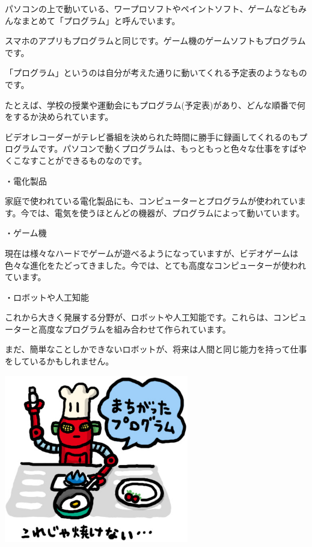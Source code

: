 \documentclass[a4paper,12pt]{jarticle}
\begin{document}
パソコンの上で動いている、ワープロソフトやペイントソフト、ゲームなどもみんなまとめて「プログラム」と呼んでいます。


\bigskip

スマホのアプリもプログラムと同じです。ゲーム機のゲームソフトもプログラムです。

「プログラム」というのは自分が考えた通りに動いてくれる予定表のようなものです。

たとえば、学校の授業や運動会にもプログラム(予定表)があり、どんな順番で何をするか決められています。

ビデオレコーダーがテレビ番組を決められた時間に勝手に録画してくれるのもプログラムです。パソコンで動くプログラムは、もっともっと色々な仕事をすばやくこなすことができるものなのです。

\bigskip

・電化製品


\bigskip

家庭で使われている電化製品にも、コンピューターとプログラムが使われています。今では、電気を使うほとんどの機器が、プログラムによって動いています。


\bigskip

・ゲーム機


\bigskip

現在は様々なハードでゲームが遊べるようになっていますが、ビデオゲームは色々な進化をたどってきました。今では、とても高度なコンピューターが使われています。


\bigskip

・ロボットや人工知能


\bigskip

これから大きく発展する分野が、ロボットや人工知能です。これらは、コンピューターと高度なプログラムを組み合わせて作られています。

まだ、簡単なことしかできないロボットが、将来は人間と同じ能力を持って仕事をしているかもしれません。



\bigskip
\bigskip

\begin{minipage}{9.781cm}
\centering
{\upshape
\includegraphics[width=8.031cm,height=7.304cm]{text02-img/text02-img006.jpg}}
\end{minipage}
\end{document}
